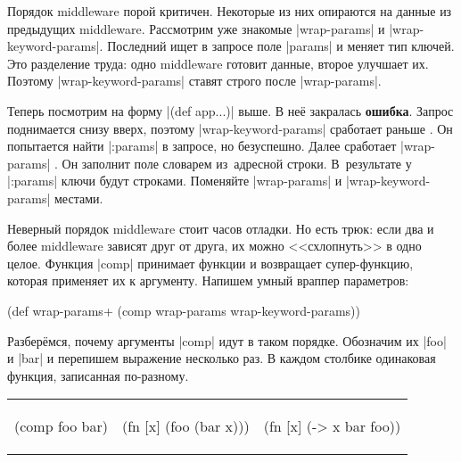 Порядок middleware порой критичен. Некоторые из них опираются на данные из
предыдущих middleware. Рассмотрим уже знакомые \spverb|wrap-params| и
\spverb|wrap-keyword-params|. Последний ищет в запросе поле \spverb|params| и
меняет тип ключей. Это разделение труда: одно middleware готовит данные, второе
улучшает их. Поэтому \spverb|wrap-keyword-params| ставят строго после
\spverb|wrap-params|.


Теперь посмотрим на форму \spverb|(def app...)| выше. В не\"{е} закралась
\textbf{ошибка}. Запрос поднимается снизу вверх, поэтому
\spverb|wrap-keyword-params| сработает раньше . Он попытается найти
\spverb|:params| в запросе, но безуспешно. Далее сработает \spverb|wrap-params|
. Он заполнит поле словарем из~адресной строки. В~результате у
\spverb|:params| ключи будут строками. Поменяйте \spverb|wrap-params| и
\spverb|wrap-keyword-params| местами.

Неверный порядок middleware стоит часов отладки. Но есть трюк: если два и более
middleware зависят друг от друга, их можно <<схлопнуть>> в одно целое. Функция
\spverb|comp| принимает функции и возвращает супер-функцию, которая применяет их
к аргументу. Напишем умный враппер параметров:


\begin{english}
  \begin{clojure}
(def wrap-params+ (comp wrap-params wrap-keyword-params))
  \end{clojure}
\end{english}

Разбер\"{е}мся, почему аргументы \spverb|comp| идут в таком порядке. Обозначим
их \spverb|foo| и \spverb|bar| и перепишем выражение несколько раз. В каждом
столбике одинаковая функция, записанная по-разному.

\noindent
\begin{tabular}{ @{}p{3.2cm} @{}p{3.5cm} @{}p{3.5cm} }

\begin{english}
  \begin{clojure}
(comp foo bar)
  \end{clojure}
\end{english}

&

\begin{english}
  \begin{clojure}
(fn [x]
  (foo (bar x)))
  \end{clojure}
\end{english}

&

\begin{english}
  \begin{clojure}
(fn [x] (-> x
            bar
            foo))
  \end{clojure}
\end{english}

\end{tabular}

